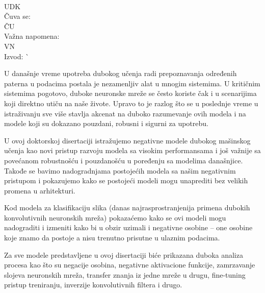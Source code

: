 \begin{tabbing}
\begin{minipage}[t]{.65\textwidth}
    \end{minipage}                                                                                  \\
  UDK                                                              \>                               \\
  Čuva se:                                                         \>                               \\
  ČU                                                               \>                               \\
  Važna napomena:                                                  \>                               \\
  VN                                                               \>                               \\
  Izvod:                   \`
  \begin{minipage}[t]{.8\textwidth}
  U današnje vreme upotreba dubokog učenja radi prepoznavanja određenih paterna u podacima postala je nezamenljiv alat u mnogim sistemima. U kritičnim sistemima pogotovo, duboke neuronske mreže se često koriste čak i u scenarijima koji direktno utiču na naše živote. Upravo to je razlog što se u poslednje vreme u istraživanju sve više stavlja akcenat na duboko razumevanje ovih modela i na modele koji su dokazano pouzdani, robusni i sigurni za upotrebu.

U ovoj doktorskoj disertaciji istražujemo negativne modele dubokog mašinskog učenja kao novi pristup razvoju modela sa visokim performansama i još važnije sa povećanom robustnošću i pouzdanošću u poređenju sa modelima današnjice. Takođe se bavimo nadogradnjama postojećih modela sa našim negativnim pristupom i pokazujemo kako se postojeći modeli mogu unaprediti bez velikih promena u arhitekturi.

Kod modela za klasifikaciju slika (danas najrasprostranjenija primena dubokih konvolutivnih neuronskih mreža) pokazaćemo kako se ovi modeli mogu nadograditi i izmeniti kako bi u obzir uzimali i negativne osobine -- one osobine koje znamo da postoje a nisu trenutno prisutne u ulaznim podacima.

Za sve modele predstavljene u ovoj disertaciji biće prikazana duboka analiza procesa kao što su negacije osobina, negativne aktivacione funkcije, zamrzavanje slojeva neuronskih mreža, transfer znanja iz jedne mreže u drugu, fine-tuning pristup treniranju, inverzije konvolutivnih filtera i drugo.


\end{minipage}
\end{tabbing}
